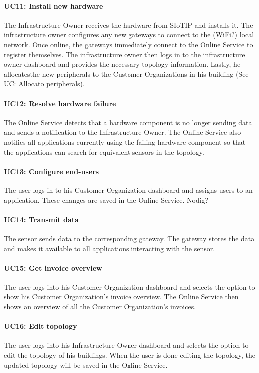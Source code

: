 \documentclass[english]{sareport}
\begin{document}
\paragraph{UC11: Install new hardware}
The Infrastructure Owner receives the hardware from SIoTIP and installs it. The infrastructure owner configures any new gateways to connect to the (WiFi?) local network. Once online, the gateways immediately connect to the Online Service to register themselves. The infrastructure owner then logs in to the infrastructure owner dashboard and provides the necessary topology information. Lastly, he allocatesthe new peripherals to the Customer Organizations in his building (See UC: Allocato peripherals).

\paragraph{UC12: Resolve hardware failure}
The Online Service detects that a hardware component is no longer sending data and sends a notification to the Infrastructure Owner. The Online Service also notifies all applications currently using the failing hardware component so that the applications can search for equivalent sensors in the topology. 

\paragraph{UC13: Configure end-users}
The user logs in to his Customer Organization dashboard and assigns users to an application. These changes are saved in the Online Service.
Nodig?

\paragraph{UC14: Transmit data}
The sensor sends data to the corresponding gateway. The gateway stores the data and makes it available to all applications interacting with the sensor.

\paragraph{UC15: Get invoice overview}
The user logs into his Customer Organization dashboard and selects the option to show his Customer Organization's invoice overview. The Online Service then shows an overview of all the Customer Organization's invoices.

\paragraph{UC16: Edit topology}
The user logs into his Infrastructure Owner dashboard and selects the option to edit the topology of his buildings. When the user is done editing the topology, the updated topology will be saved in the Online Service.
\end{document}
